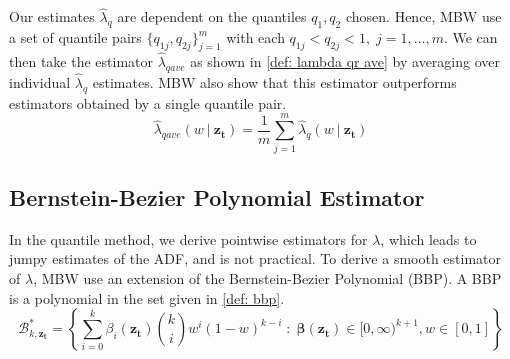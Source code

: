 \documentclass[12pt]{article}
\begin{document}
    Our estimates $\hat{\lambda}_q$ are dependent on the quantiles $q_1, q_2$ chosen. Hence, MBW use a set of quantile pairs $\{ q_{1j}, q_{2j}\}_{j = 1}^m$ with each $q_{1j} < q_{2j} < 1, \; j=1,\dots,m$. 
    We can then take the estimator $\hat{\lambda}_{qave}$ as shown in \cref{def: lambda qr ave} by averaging over individual $\hat{\lambda}_q$ estimates. 
    MBW also show that this estimator outperforms estimators obtained by a single quantile pair.
    \begin{equation} \label{def: lambda qr ave}
      \hat{\lambda}_{qave}(w \ |\ \boldsymbol{z_t}) = \frac{1}{m} \sum_{j = 1}^m \hat{\lambda}_q(w \ |\ \boldsymbol{z_t})
    \end{equation}

  \subsection{Bernstein-Bezier Polynomial Estimator}
    In the quantile method, we derive pointwise estimators for $\lambda$, which leads to jumpy estimates of the ADF, and is not practical.
    To derive a smooth estimator of $\lambda$, MBW use an extension of the Bernstein-Bezier Polynomial (BBP). A BBP is a polynomial in the set given in \cref{def: bbp}.
    \begin{equation} \label{def: bbp}
      \mathcal{B}_{k, \boldsymbol{z_t}}^* = \left\{ \sum_{i = 0}^k \beta_i(\boldsymbol{z_t}) {k\choose i} w^i (1 - w)^{k - i} \; : \; \boldsymbol{\beta}(\boldsymbol{z_t}) \in [0, \infty)^{k + 1}, w \in [0, 1] \right\}
    \end{equation}
\end{document}
